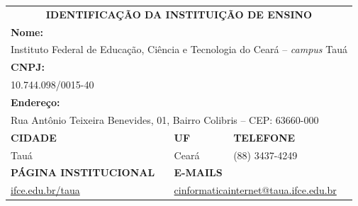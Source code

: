 \documentclass[
	12pt,				%
	openright,			%
	twoside,			%
	a4paper,			%
	chapter=TITLE,		%
	english,			%
	french,				%
	spanish,			%
	brazil,				%
	]{abntex2}
\begin{document}
\small
\noindent
\begin{tabularx}{\linewidth}{X X X X }
    
    \multicolumn{4}{c}{\cellcolor{gray!40}\textbf{IDENTIFICAÇÃO DA INSTITUIÇÃO DE ENSINO}} \\

    \multicolumn{4}{l}{\cellcolor{gray!20}\textbf{Nome:}} \\
    \multicolumn{4}{l}{Instituto Federal de Educação, Ciência e Tecnologia do Ceará -- \textit{campus} Tauá} \\
    
    \multicolumn{4}{l}{\cellcolor{gray!20}\textbf{CNPJ:}} \\
    \multicolumn{4}{l}{10.744.098/0015-40} \\
    
    \multicolumn{4}{l}{\cellcolor{gray!20}\textbf{Endere\c{c}o:}} \\
    \multicolumn{4}{l}{Rua Antônio Teixeira Benevides, 01, Bairro Colibris -- CEP: 63660-000} \\
    
    
     
    \multicolumn{2}{l}{\cellcolor{gray!20}\textbf{CIDADE}} & \cellcolor{gray!20} \textbf{UF} & \cellcolor{gray!20} \textbf{TELEFONE} \\
     
    \multicolumn{2}{l}{Tauá} & Ceará & (88) 3437-4249\\

     \multicolumn{2}{l}{\cellcolor{gray!20}\textbf{PÁGINA INSTITUCIONAL}} &
     \multicolumn{2}{l}{\cellcolor{gray!20}\textbf{E-MAILS}} \\
     
     \multicolumn{2}{l}{\href{http://ifce.edu.br/taua}{ifce.edu.br/taua}} &
     \multicolumn{2}{l}{\href{mailto:cinformaticainternet@taua.ifce.edu.br}{cinformaticainternet@taua.ifce.edu.br}} \\
     
     
\end{tabularx}

\vspace{1em}
\end{document}

